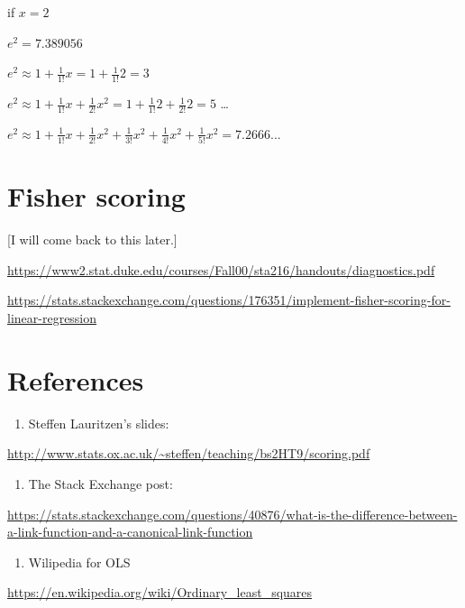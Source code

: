 \documentclass[]{book}
\providecommand{\tightlist}{%
  \setlength{\itemsep}{0pt}\setlength{\parskip}{0pt}}
\begin{document}
if \(x=2\)

\(e^2 = 7.389056\)

\(e^2 \approx 1+\frac{1}{1!}x =1+\frac{1}{1!}2=3\)

\(e^2 \approx 1+\frac{1}{1!}x+\frac{1}{2!}x^2 =1+\frac{1}{1!}2 + \frac{1}{2!}2 =5\)
\ldots{}

\(e^2 \approx 1+\frac{1}{1!}x+\frac{1}{2!}x^2 +\frac{1}{3!}x^2+\frac{1}{4!}x^2+\frac{1}{5!}x^2=7.2666...\)

\hypertarget{fisher-scoring}{%
\section{Fisher scoring}\label{fisher-scoring}}

{[}I will come back to this later.{]}

\url{https://www2.stat.duke.edu/courses/Fall00/sta216/handouts/diagnostics.pdf}

\url{https://stats.stackexchange.com/questions/176351/implement-fisher-scoring-for-linear-regression}

\hypertarget{references-1}{%
\section{References}\label{references-1}}

\begin{enumerate}
\def\labelenumi{\arabic{enumi}.}
\tightlist
\item
  Steffen Lauritzen's slides:
\end{enumerate}

\url{http://www.stats.ox.ac.uk/~steffen/teaching/bs2HT9/scoring.pdf}

\begin{enumerate}
\def\labelenumi{\arabic{enumi}.}
\setcounter{enumi}{1}
\tightlist
\item
  The Stack Exchange post:
\end{enumerate}

\url{https://stats.stackexchange.com/questions/40876/what-is-the-difference-between-a-link-function-and-a-canonical-link-function}

\begin{enumerate}
\def\labelenumi{\arabic{enumi}.}
\setcounter{enumi}{2}
\tightlist
\item
  Wilipedia for OLS
\end{enumerate}

\url{https://en.wikipedia.org/wiki/Ordinary_least_squares}
\end{document}
